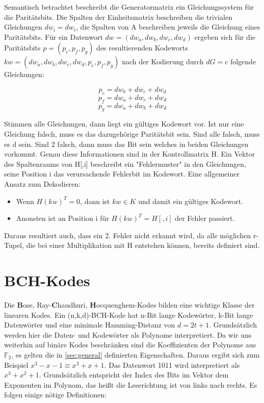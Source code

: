 Semantisch betrachtet beschreibt die Generatormatrix ein Gleichungssystem für die Paritätsbits. Die Spalten der Einheitsmatrix beschreiben die trivialen Gleichungen $dw_i = dw_i$, die Spalten von A beschreiben jeweils die Gleichung eines Paritätsbits. Für ein Datenwort $dw=(dw_a,dw_b,dw_c,dw_d)$ ergeben sich für die Paritätsbits $p=(p_e,p_f,p_g)$ des resultierenden Kodeworts $kw=(dw_a,dw_b,dw_c,dw_d,p_e,p_f,p_g)$ nach der Kodierung durch $dG = c$ folgende Gleichungen:

$$ p_e = dw_b+dw_c+dw_d$$
$$ p_f = dw_a+dw_c+dw_d$$
$$ p_g = dw_a+dw_b+dw_d$$

Stimmen alle Gleichungen, dann liegt ein gültiges Kodewort vor. Ist nur eine Gleichung falsch, muss es das dazugehörige Paritätsbit sein. Sind alle falsch, muss es d sein. Sind 2 falsch, dann muss das Bit sein welches in beiden Gleichungen vorkommt. Genau diese Informationen sind in der Kontrollmatrix H. Ein Vektor des Spaltenraums von H[,i] beschreibt ein "Fehlermuster" in den Gleichungen, seine Position i das verursachende Fehlerbit im Kodewort. Eine allgemeiner Ansatz zum Dekodieren:

\begin{itemize}
\item Wenn $H(kw)^T = 0$, dann ist $kw \in K$ und damit ein gültiges Kodewort.
\item Anonsten ist an Position i für $H(kw)^T = H[ ,i]$ der Fehler passiert.
\end{itemize}

Daraus resultiert auch, dass ein 2. Fehler nicht erkannt wird, da alle möglichen r-Tupel, die bei einer Multiplikation mit H entstehen können, bereits definiert sind. 


\section{BCH-Kodes}
\label{sec:bch}

Die \textbf{B}ose, Ray-\textbf{C}haudhuri, \textbf{H}ocquenghem-Kodes bilden eine wichtige Klasse der linearen Kodes.\cite[S. 168]{huffman2010fundamentals}
Ein (n,k,d)-BCH-Kode hat n-Bit lange Kodewörter, k-Bit lange Datenwörter und eine minimale Hamming-Distanz von $d = 2t+1$.
Grundsätzlich werden hier die Daten- und Kodewörter als Polynome interpretiert. Da wir uns weiterhin auf binäre Kodes beschränken sind die Koeffizienten der Polynome aus 
$\mathbb{F}_{2}$, es gelten die in \ref{sec:general} definierten Eigenschaften. Daraus ergibt sich zum Beispiel $x^3 -x -1 \equiv x^3 + x + 1$. Das Datenwort 1011 wird interpretiert als $x^3 + x^2 + 1$. Grundsätzlich entspricht der Index des Bits im Vektor dem Exponenten im Polynom, das heißt die Leserichtung ist von links nach rechts. 
Es folgen einige nötige Definitionen:


